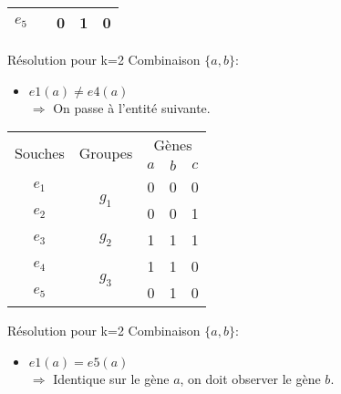\begin{overprint}
{\begin{minipage}[l]{0.46\linewidth}
\begin{center}
\begin{tabular}{|c||c|c|c|c|}
						\cline{1-1} \cline{3-5}
						$e_5$&& 0 & 1 & 0\\
						\hline
					\end{tabular}
				\end{center}
			\end{minipage}
			\hspace{0.6cm}
			\begin{minipage}[r]{0.46\linewidth}
				\begin{block}{Résolution pour k=2}
					Combinaison $\{a,b\}$:
					\begin{itemize}
						\item $e1(a) \not = e4(a) $ \\ $\Rightarrow$ On passe à l'entité suivante.
					\end{itemize}
				\end{block}
			\end{minipage}
		}
		{
			\begin{minipage}[l]{0.46\linewidth}
				\begin{center}
					\begin{tabular}{|c||c|c|c|c|}
						\hline
						\multirow{2}{*}{Souches}&\multirow{2}{*}{Groupes}&\multicolumn{3}{c|}{Gènes
						}\\
						&&\cellcolor{blue!75}$a$&\cellcolor{blue!75}$b$&$c$\\
						\hline
						\hline
						$e_1$&\multirow{2}{*}{$g_1$}& \cellcolor{cyan}0 & 0 & 0\\
						\cline{1-1} \cline{3-5}
						$e_2$&& 0 & 0 & 1\\
						\hline
						\hline
						$e_3$&$g_2$& 1 & 1 & 1\\
						\hline
						\hline
						$e_4$&\multirow{2}{*}{$g_3$}& 1 & 1 & 0\\
						\cline{1-1} \cline{3-5}
						$e_5$&& \cellcolor{cyan}0 & 1 & 0\\
						\hline
					\end{tabular}
				\end{center}
			\end{minipage}
			\hspace{0.6cm}
			\begin{minipage}[r]{0.46\linewidth}
				\begin{block}{Résolution pour k=2}
					Combinaison $\{a,b\}$:
					\begin{itemize}
						\item $e1(a) = e5(a) $ \\ $\Rightarrow$ Identique sur le gène $a$, on doit observer le gène $b$.

\end{itemize}
\end{block}
\end{minipage}}
\end{overprint}
